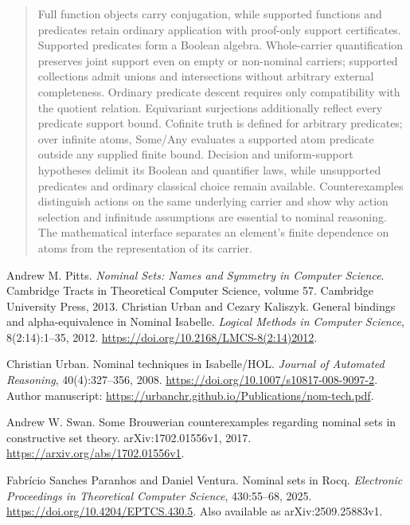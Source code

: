 \documentclass[11pt]{article}
\theoremstyle{definition}
\theoremstyle{remark}
\begin{document}
\begin{abstract}
Full function objects carry conjugation, while supported functions and
predicates retain ordinary application with proof-only support certificates.
Supported predicates form a Boolean algebra. Whole-carrier quantification
preserves joint support even on empty or non-nominal carriers; supported
collections admit unions and intersections without arbitrary external
completeness. Ordinary predicate descent requires only compatibility with
the quotient relation. Equivariant surjections additionally reflect every
predicate support bound. Cofinite truth is defined for arbitrary predicates;
over infinite atoms, Some/Any evaluates a supported atom predicate outside
any supplied finite bound. Decision and uniform-support hypotheses delimit
its Boolean and quantifier laws, while unsupported predicates and ordinary
classical choice remain available.
Counterexamples distinguish actions on the same underlying carrier and show
why action selection and infinitude assumptions are essential to nominal
reasoning. The mathematical interface separates an element's finite dependence
on atoms from the representation of its carrier.
\end{abstract}










\begin{thebibliography}{9}
Andrew M. Pitts.
\newblock \emph{Nominal Sets: Names and Symmetry in Computer Science}.
\newblock Cambridge Tracts in Theoretical Computer Science, volume 57.
\newblock Cambridge University Press, 2013.
Christian Urban and Cezary Kaliszyk.
\newblock General bindings and alpha-equivalence in Nominal Isabelle.
\newblock \emph{Logical Methods in Computer Science}, 8(2:14):1--35, 2012.
\newblock \url{https://doi.org/10.2168/LMCS-8(2:14)2012}.

Christian Urban.
\newblock Nominal techniques in Isabelle/HOL.
\newblock \emph{Journal of Automated Reasoning}, 40(4):327--356, 2008.
\newblock \url{https://doi.org/10.1007/s10817-008-9097-2}.
\newblock Author manuscript: \url{https://urbanchr.github.io/Publications/nom-tech.pdf}.

Andrew W. Swan.
\newblock Some Brouwerian counterexamples regarding nominal sets in constructive set theory.
\newblock arXiv:1702.01556v1, 2017.
\newblock \url{https://arxiv.org/abs/1702.01556v1}.

Fabr{\'i}cio Sanches Paranhos and Daniel Ventura.
\newblock Nominal sets in Rocq.
\newblock \emph{Electronic Proceedings in Theoretical Computer Science},
430:55--68, 2025.
\newblock \url{https://doi.org/10.4204/EPTCS.430.5}.
\newblock Also available as arXiv:2509.25883v1.
\end{thebibliography}
\end{document}
